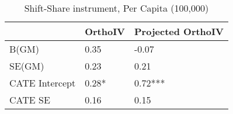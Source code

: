 \begin{table}\centering\caption{Shift-Share instrument, Per Capita (100,000)}\begin{tabular}{lll}
\toprule
                & OrthoIV   & Projected OrthoIV   \\
\midrule
 B(GM)          & 0.35      & -0.07               \\
 SE(GM)         & 0.23      & 0.21                \\
 CATE Intercept & 0.28*     & 0.72***             \\
 CATE SE        & 0.16      & 0.15                \\
\bottomrule
\end{tabular}\end{table}